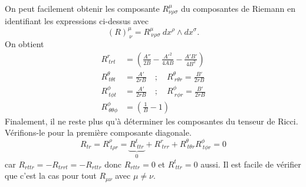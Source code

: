 \documentclass[a4paper,11pt]{report}
\theoremstyle{definition}
\theoremstyle{plain}
\theoremstyle{definition}
\theoremstyle{remark}
\begin{document}
        On peut facilement obtenir les composante $R^\mu_{\nu\rho\sigma}$ du composantes de Riemann en identifiant les expressions ci-dessus avec
        \begin{equation}
            (R)^\mu_{~\nu} = R^\mu_{~\nu\rho\sigma}~dx^\rho\wedge dx^\sigma.
        \end{equation}
        On obtient
        \begin{align}
            R^r_{~trt} &= \left( \frac{A''}{2B}-\frac{A'^2}{4AB}-\frac{A'B'}{4B^2} \right)\\
            R^\theta_{~t\theta t} &= \frac{A'}{2rB}\quad;\quad  R^\theta_{~r\theta r} = \frac{B'}{2rB}\\
            R^\phi_{~t\phi t} &= \frac{A'}{2rB} \quad;\quad R^\phi_{~r\phi r} = \frac{B'}{2rB}\\
            R^\phi_{~\theta\theta\phi} &= \left( \frac{1}{B}-1 \right)
        \end{align}
        Finalement, il ne reste plus qu'à déterminer les composantes du tenseur de Ricci. Vérifions-le pour la première composante diagonale.
        \begin{equation}
            R_{tr} = R^\rho_{~t\rho r} = \underbrace{R^t_{~tt r}}_{0}+R^r_{~trr}+R^\theta_{~t\theta r}R^\phi_{~t\phi r} = 0
        \end{equation}
        car $R_{rttr} = -R_{trrt} = -R_{rttr}$ donc $R_{rttr} = 0$ et $R^t_{~tt r} = 0$ aussi. Il est facile de vérifier que c'est la cas pour tout $R_{\mu\nu}$ avec $\mu\neq\nu$.\\
\end{document}

